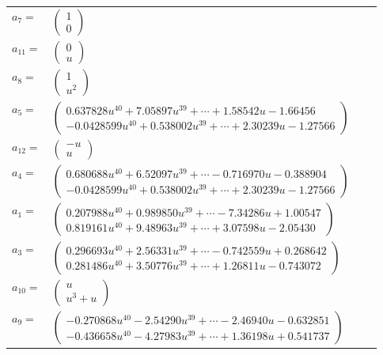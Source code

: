 \documentclass[1p]{elsarticle_modified}
\theoremstyle{definition}
\begin{document}
\begin{tabular}{m{7pt} m{180pt} m{7pt} m{180pt} }
\flushright $a_{7}=$&$\begin{pmatrix}1\\0\end{pmatrix}$ \\
\flushright $a_{11}=$&$\begin{pmatrix}0\\u\end{pmatrix}$ \\
\flushright $a_{8}=$&$\begin{pmatrix}1\\u^2\end{pmatrix}$ \\
\flushright $a_{5}=$&$\begin{pmatrix}0.637828 u^{40}+7.05897 u^{39}+\cdots+1.58542 u-1.66456\\-0.0428599 u^{40}+0.538002 u^{39}+\cdots+2.30239 u-1.27566\end{pmatrix}$ \\
\flushright $a_{12}=$&$\begin{pmatrix}- u\\u\end{pmatrix}$ \\
\flushright $a_{4}=$&$\begin{pmatrix}0.680688 u^{40}+6.52097 u^{39}+\cdots-0.716970 u-0.388904\\-0.0428599 u^{40}+0.538002 u^{39}+\cdots+2.30239 u-1.27566\end{pmatrix}$ \\
\flushright $a_{1}=$&$\begin{pmatrix}0.207988 u^{40}+0.989850 u^{39}+\cdots-7.34286 u+1.00547\\0.819161 u^{40}+9.48963 u^{39}+\cdots+3.07598 u-2.05430\end{pmatrix}$ \\
\flushright $a_{3}=$&$\begin{pmatrix}0.296693 u^{40}+2.56331 u^{39}+\cdots-0.742559 u+0.268642\\0.281486 u^{40}+3.50776 u^{39}+\cdots+1.26811 u-0.743072\end{pmatrix}$ \\
\flushright $a_{10}=$&$\begin{pmatrix}u\\u^3+u\end{pmatrix}$ \\
\flushright $a_{9}=$&$\begin{pmatrix}-0.270868 u^{40}-2.54290 u^{39}+\cdots-2.46940 u-0.632851\\-0.436658 u^{40}-4.27983 u^{39}+\cdots+1.36198 u+0.541737\end{pmatrix}$ \\

\end{tabular}
\end{document}
